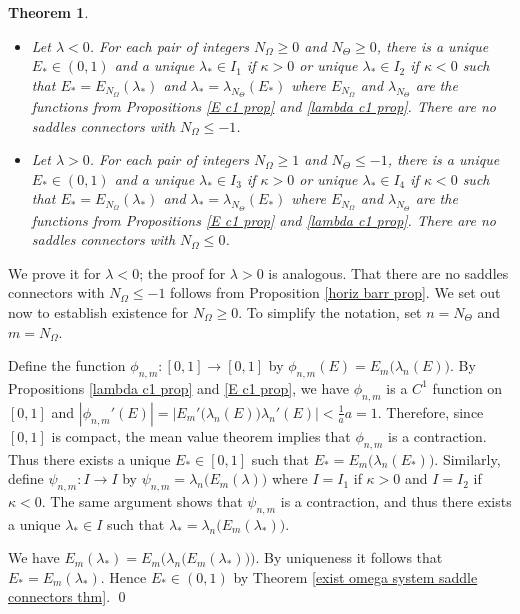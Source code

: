 \documentclass[11 pt]{article}
\newtheorem{thm}{Theorem}[section]
\renewcommand\l{\lambda}
\renewcommand\({\left(}
\renewcommand\){\right)}
\newcommand\<{\langle}
\renewcommand\>{\rangle}
\renewcommand\l{\lambda}
\newcommand\8{\infty}
\begin{document}
\medskip
\medskip


\begin{thm}\label{iteration thm}\:$\phantom{nix}$
\begin{itemize}
\item[$\bullet$] Let $\l < 0$. For each pair of integers $N_\Omega \geq 0$ and $N_\Theta \geq 0$, there is a unique $E_* \in (0,1)$ and a unique $\l_* \in I_1$ if $\kappa > 0$ or unique $\l_* \in I_2$ if $\kappa < 0$ such that  $E_* = E_{N_\Omega}(\l_*)$ and $\l_* = \l_{N_\Theta}(E_*)$ where $E_{N_\Omega}$ and $\l_{N_\Theta}$ are the functions from Propositions \emph{\ref{E c1 prop}} and \emph{\ref{lambda c1 prop}}. There are no saddles connectors with $N_\Omega \leq -1$.


\item[$\bullet$] Let $\l > 0$. For each pair of integers $N_\Omega \geq 1$ and $N_\Theta \leq -1$, there is a unique $E_* \in (0,1)$ and a unique $\l_* \in I_3$ if $\kappa > 0$ or unique $\l_* \in I_4$ if $\kappa < 0$ such that $E_* = E_{N_\Omega}(\l_*)$ and $\l_* = \l_{N_\Theta}(E_*)$ where $E_{N_\Omega}$ and $\l_{N_\Theta}$ are the functions from Propositions \emph{\ref{E c1 prop}} and \emph{\ref{lambda c1 prop}}. There are no saddles connectors with $N_\Omega \leq 0$.
\end{itemize}
\end{thm}

\proof
We prove it for $\l < 0$; the proof for $\l > 0$ is analogous. That there are no saddles connectors with $N_\Omega \leq -1$ follows from Proposition \ref{horiz barr prop}. We set out now to establish existence for $N_\Omega \geq 0$. To simplify the notation, set $n = N_\Theta$ and $m = N_\Omega$. 

Define the function $\phi_{n,m} \colon [0,1] \to [0,1]$ by $\phi_{n,m}(E) = E_m\big(\l_n(E)\big)$. By Propositions \ref{lambda c1 prop} and \ref{E c1 prop}, we have $\phi_{n,m}$ is a $C^1$ function on $[0,1]$ and $|\phi_{n,m}'(E)| = |E_m'\big(\l_n(E)\big)\l_n'(E)| < \frac{1}{a}a = 1$. Therefore, since $[0,1]$ is compact, the mean value theorem implies that $\phi_{n,m}$ is a contraction. Thus there exists a unique $E_* \in [0,1]$ such that $E_* = E_m\big(\l_n(E_*)\big)$. Similarly, define $\psi_{n,m} \colon I \to I$ by $\psi_{n,m} = \l_n\big(E_m(\l)\big)$ where $I = I_1$ if $\kappa > 0$ and $I = I_2$ if $\kappa < 0$. The same argument shows that $\psi_{n,m}$ is a contraction, and thus there exists a unique $\l_* \in I$ such that $\l_* = \l_n\big(E_m(\l_*)\big)$. 

We have $E_m(\l_*) = E_m \big(\l_n\big(E_m(\l_*)\big)\big)$. By uniqueness it follows that $E_* = E_m(\l_*)$. Hence $E_* \in (0,1)$ by Theorem \ref{exist omega system saddle connectors thm}. 
\qed
\end{document}
